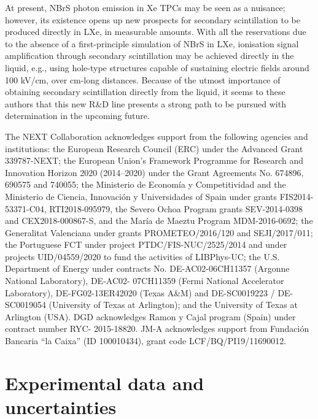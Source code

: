 \documentclass[%
 reprint,
superscriptaddress,
 amsmath,amssymb,
 aps,
]{revtex4-2}
\begin{document}
At present, NBrS photon emission in Xe TPCs may be seen as a nuisance; however, its existence opens up new prospects for secondary scintillation to be produced directly in LXe, in measurable amounts. With all the reservations due to the absence of a first-principle simulation of NBrS in LXe, ionisation signal amplification through secondary scintillation may be achieved directly in the liquid, e.g., using hole-type structures capable of sustaining electric fields around 100 kV/cm, over cm-long distances. Because of the utmost importance of obtaining secondary scintillation directly from the liquid, it seems to these authors that this new R\&D line presents a strong path to be pursued with determination in the upcoming future.

\begin{acknowledgments}
The NEXT Collaboration acknowledges support from the following agencies and institutions: the European Research Council (ERC) under the Advanced Grant 339787-NEXT; the European Union’s Framework Programme for Research and Innovation Horizon 2020 (2014–2020) under the Grant Agreements No. 674896, 690575 and 740055; the Ministerio de Econom\'ia y Competitividad and the Ministerio de Ciencia, Innovaci\'on y Universidades of Spain under grants FIS2014-53371-C04, RTI2018-095979, the Severo Ochoa Program grants SEV-2014-0398 and CEX2018-000867-S, and the Mar\'ia de Maeztu Program MDM-2016-0692; the Generalitat Valenciana under grants PROMETEO/2016/120 and SEJI/2017/011; the Portuguese FCT under project PTDC/FIS-NUC/2525/2014 and under projects UID/04559/2020 to fund the activities of LIBPhys-UC; the U.S. Department of Energy under contracts No. DE-AC02-06CH11357 (Argonne National Laboratory), DE-AC02- 07CH11359 (Fermi National Accelerator Laboratory), DE-FG02-13ER42020 (Texas A\&M) and DE-SC0019223 / DE-SC0019054 (University of Texas at Arlington); and the University of Texas at Arlington (USA). DGD acknowledges Ramon y Cajal program (Spain) under contract number RYC- 2015-18820. JM-A acknowledges support from Fundaci\'on Bancaria “la Caixa” (ID 100010434), grant code LCF/BQ/PI19/11690012. 
\end{acknowledgments}


\appendix

\section{\label{sec:values}Experimental data and uncertainties}
\end{document}
